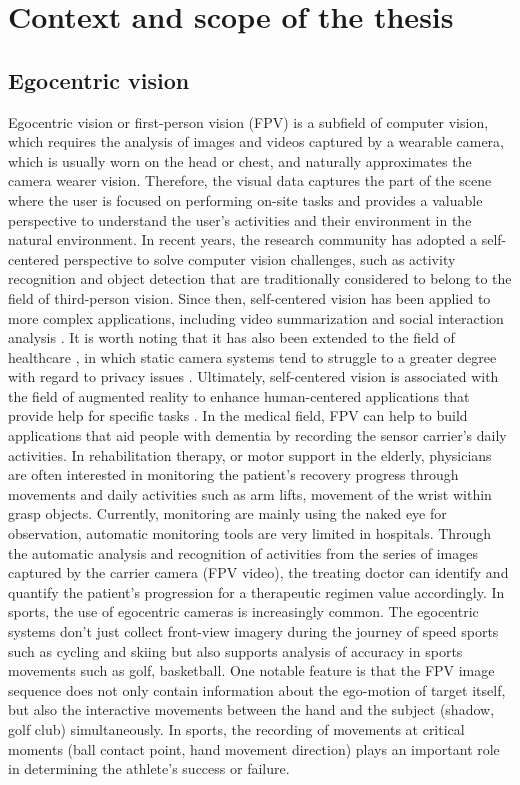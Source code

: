 \section{Context and scope of the thesis}
\subsection{Egocentric vision}
Egocentric vision or first-person vision (FPV) is a subfield of computer vision, which requires the analysis of images and videos captured by a wearable camera, which is usually worn on the head or chest, and naturally approximates the camera wearer vision. Therefore, the visual data captures the part of the scene where the user is focused on performing on-site tasks and provides a valuable perspective to understand the user's activities and their environment in the natural environment.
In recent years, the research community has adopted a self-centered perspective to solve computer vision challenges, such as activity recognition \cite{10.1109/ICCV.2011.6126269} and object detection \cite{5995444} that are traditionally considered to belong to the field of third-person vision. Since then, self-centered vision has been applied to more complex applications, including video summarization \cite{6247820} and social interaction analysis \cite{7780657}. It is worth noting that it has also been extended to the field of healthcare \cite{wearable}, in which static camera systems tend to struggle to a greater degree with regard to privacy issues \cite{6091176}. Ultimately, self-centered vision is associated with the field of augmented reality to enhance human-centered applications that provide help for specific tasks \cite{10.1145/3041164.3041185}.
In the medical field, FPV can help to build applications that aid people with dementia by recording the sensor carrier's daily activities. In rehabilitation therapy, or motor support in the elderly, physicians are often interested in monitoring the patient's recovery progress through movements and daily activities such as arm lifts, movement of the wrist within grasp objects. Currently, monitoring are mainly using the naked eye for observation, automatic monitoring tools are very limited in hospitals. Through the automatic analysis and recognition of activities from the series of images captured by the carrier camera (FPV video), the treating doctor can identify and quantify the patient's progression for a therapeutic regimen value accordingly.
In sports, the use of egocentric cameras is increasingly common. The egocentric systems don't just collect front-view imagery during the journey of speed sports such as cycling and skiing but also supports analysis of accuracy in sports movements such as golf, basketball. One notable feature is that the FPV image sequence does not only contain information about the ego-motion of target itself, but also the interactive movements between the hand and the subject (shadow, golf club) simultaneously. In sports, the recording of movements at critical moments (ball contact point, hand movement direction) plays an important role in determining the athlete's success or failure.
